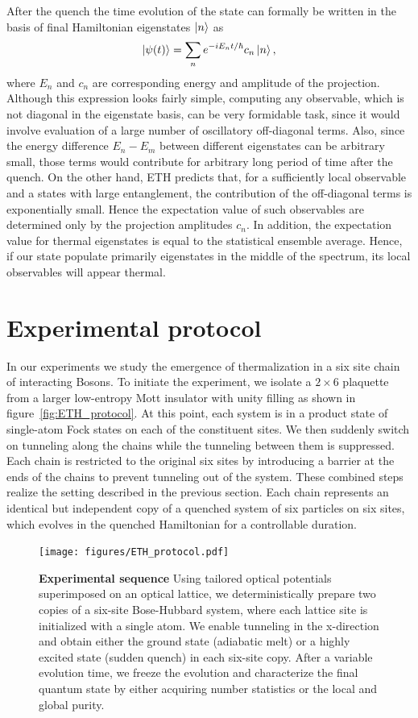 After the quench the time evolution of the state can formally be written in the basis of final Hamiltonian eigenstates $\left|n\right\rangle$ as
\begin{equation}
\left|\psi(t)\right\rangle=\sum_n e^{-iE_nt/\hbar}c_n\left|n\right\rangle,
\end{equation}
where $E_n$ and $c_n$ are corresponding energy and amplitude of the projection. Although this expression looks fairly simple, computing any observable, which is not diagonal in the eigenstate basis, can be very formidable task, since it would involve evaluation of a large number of oscillatory off-diagonal terms. Also, since the energy difference $E_n-E_m$ between different eigenstates can be arbitrary small, those terms would contribute for arbitrary long period of time after the quench. On the other hand, ETH predicts that, for a sufficiently local observable and a states with large entanglement, the contribution of the off-diagonal terms is exponentially small. Hence the expectation value of such observables are determined only by the projection amplitudes $c_n$. In addition, the expectation value for thermal eigenstates is equal to the statistical ensemble average. Hence, if our state populate primarily eigenstates in the middle of the spectrum, its local observables will appear thermal.  

\section{Experimental protocol}
In our experiments we study the emergence of thermalization in a six site chain of interacting Bosons. To initiate the experiment, we isolate a $2 \times 6$ plaquette from a larger low-entropy Mott insulator with unity filling as shown in figure~\ref{fig:ETH_protocol}. At this point, each system is in a product state of single-atom Fock states on each of the constituent sites. We then suddenly switch on tunneling along the chains while the tunneling between them is suppressed. Each chain is restricted to the original six sites by introducing a barrier at the ends of the chains to prevent tunneling out of the system. These combined steps realize the setting described in the previous section. Each chain represents an identical but independent copy of a quenched system of six particles on six sites, which evolves in the quenched Hamiltonian for a controllable duration.

\begin{figure}[h!]
	\centering
	\texttt{[image: figures/ETH\_protocol.pdf]}
	\caption{{\bf Experimental sequence} Using tailored optical potentials superimposed on an optical lattice, we deterministically prepare two copies of a six-site Bose-Hubbard system, where each lattice site is initialized with a single atom. We enable tunneling in the x-direction and obtain either the ground state (adiabatic melt) or a highly excited state (sudden quench) in each six-site copy. After a variable evolution time, we freeze the evolution and characterize the final quantum state by either acquiring number statistics or the local and global purity.}
	
	\label{fig:protocol}
\end{figure} 


